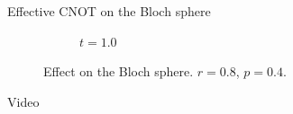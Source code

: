 \begin{frame}{Effective CNOT on the Bloch sphere}
\begin{figure}[h!]
\begin{subfigure}{0.32\textwidth}
            \caption{$t=1.0$}
        \end{subfigure}
        \caption{Effect on the Bloch sphere. $r=0.8$, $p=0.4$.}
    \end{figure}
\end{frame}

\begin{frame}{Video}
    \begin{figure}
    \end{figure}
\end{frame}
